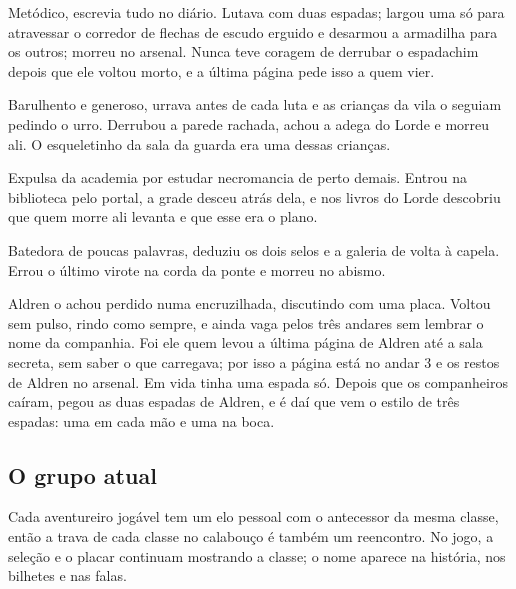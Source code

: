 \documentclass[11pt,a4paper]{article}
\begin{document}
\begin{description}[leftmargin=0pt]
    \item[Sir Aldren, cavaleiro e fundador.] Metódico, escrevia tudo no diário. Lutava com duas espadas; largou uma só para atravessar o corredor de flechas de escudo erguido e desarmou a armadilha para os outros; morreu no arsenal. Nunca teve coragem de derrubar o espadachim depois que ele voltou morto, e a última página pede isso a quem vier.
    \item[Brakka, bárbaro.] Barulhento e generoso, urrava antes de cada luta e as crianças da vila o seguiam pedindo o urro. Derrubou a parede rachada, achou a adega do Lorde e morreu ali. O esqueletinho da sala da guarda era uma dessas crianças.
    \item[Maelis, maga.] Expulsa da academia por estudar necromancia de perto demais. Entrou na biblioteca pelo portal, a grade desceu atrás dela, e nos livros do Lorde descobriu que quem morre ali levanta e que esse era o plano.
    \item[Wren, ladina.] Batedora de poucas palavras, deduziu os dois selos e a galeria de volta à capela. Errou o último virote na corda da ponte e morreu no abismo.
    \item[O espadachim (Mayoi Michio).] Aldren o achou perdido numa encruzilhada, discutindo com uma placa. Voltou sem pulso, rindo como sempre, e ainda vaga pelos três andares sem lembrar o nome da companhia. Foi ele quem levou a última página de Aldren até a sala secreta, sem saber o que carregava; por isso a página está no andar 3 e os restos de Aldren no arsenal. Em vida tinha uma espada só. Depois que os companheiros caíram, pegou as duas espadas de Aldren, e é daí que vem o estilo de três espadas: uma em cada mão e uma na boca.
\end{description}

\subsection{O grupo atual}

Cada aventureiro jogável tem um elo pessoal com o antecessor da mesma classe, então a trava de cada classe no calabouço é também um reencontro. No jogo, a seleção e o placar continuam mostrando a classe; o nome aparece na história, nos bilhetes e nas falas.
\end{document}
